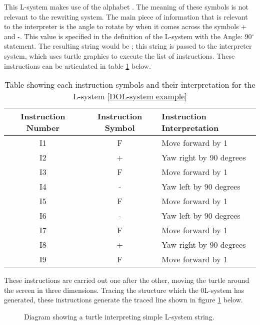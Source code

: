 \noindent
This L-system makes use of the alphabet . The meaning of these symbols is not relevant to the rewriting system. The main piece of information that is relevant to the interpreter is the angle to rotate by when it comes across the symbols + and -. This value is specified in the definition of the L-system with the Angle: 90$^{\circ}$ statement. The resulting string would be ; this string is passed to the interpreter system, which uses turtle graphics to execute the list of instructions. These instructions can be articulated in table \ref{Instruction Interpretation} below.

\begin{table}[h!]
\centering
\begin{tabular}{ | c | c | l | }
\hline
	 	Instruction Number & Instruction Symbol & Instruction Interpretation \\  
\hline
\hline
	I1 						& F & Move forward by 1\\
\hline
	I2						& + & Yaw right by 90 degrees\\
\hline
	I3						& F & Move forward by 1\\
\hline
	I4						& - & Yaw left by 90 degrees \\
\hline
	I5						& F & Move forward by 1\\
\hline
	I6 						& - & Yaw left by 90 degrees \\
\hline
	I7 						& F & Move forward by 1\\
\hline
	I8 						& + & Yaw right by 90 degrees\\
\hline
	I9 						& F & Move forward by 1\\
\hline
\end{tabular}
\caption{Table showing each instruction symbols and their interpretation for the L-system \ref{DOL-system example}}
\label{Instruction Interpretation}
\end{table}
\FloatBarrier

\noindent
These instructions are carried out one after the other, moving the turtle around the screen in three dimensions. Tracing the structure which the 0L-system has generated, these instructions generate the traced line shown in figure \ref{basic turtle} below.

\begin{figure}[htbp]
	{\centering
		\setlength{\fboxrule}{1pt}
		\vspace{7px}
		\caption{Diagram showing a turtle interpreting simple L-system string.} \label{basic turtle}
	}
\end{figure}
\FloatBarrier

